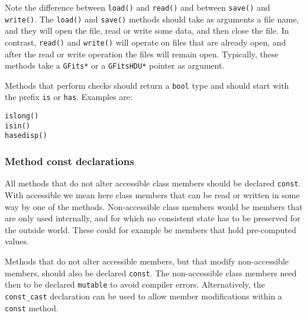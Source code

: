 \documentclass{article}[12pt,a4]
\begin{document}
Note the difference between {\tt load()} and {\tt read()} and between {\tt save()} and {\tt write()}.
The {\tt load()} and {\tt save()} methods should take as arguments a file name, and they
will open the file, read or write some data, and then close the file.
In contrast, {\tt read()} and {\tt write()} will operate on files that are already open, and after
the read or write operation the files will remain open.
Typically, these methods take a {\tt GFits*} or a {\tt GFitsHDU*} pointer as argument.

Methods that perform checks should return a {\tt bool} type and should start with the
prefix {\tt is} or {\tt has}.
Examples are:
\begin{verbatim}
islong()
isin()
hasedisp()
\end{verbatim}


\subsubsection{Method const declarations}

All methods that do not alter accessible class members should be declared {\tt const}.
With accessible we mean here class members that can be read or written in some
way by one of the methods.
Non-accessible class members would be members that are only used internally, and
for which no consistent state has to be preserved for the outside world.
These could for example be members that hold pre-computed values.

Methods that do not alter accessible members, but that modify non-accessible
members, should also be declared {\tt const}.
The non-accessible class members need then to be declared {\tt mutable} to avoid
compiler errors.
Alternatively, the {\tt const\_cast} declaration can be used to allow member modifications
within a {\tt const} method.
\end{document}
